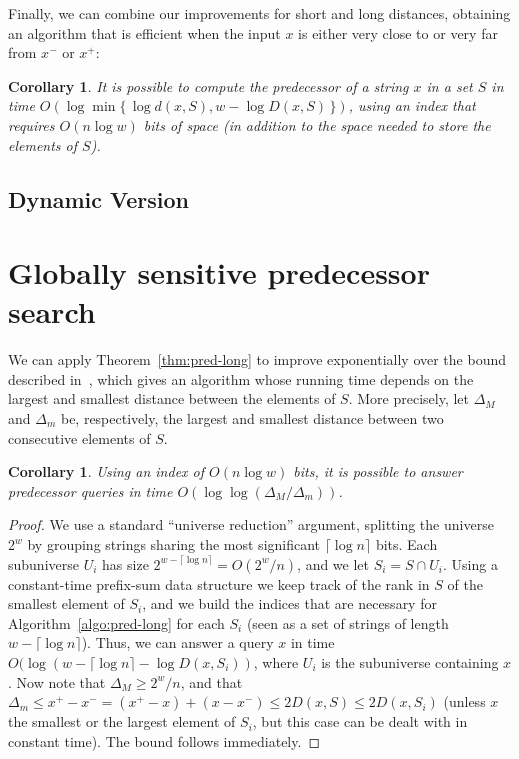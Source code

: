 \documentclass[a4paper,11pt]{article}
\newtheorem{corollary}[theorem]{Corollary}
\newcommand{\?}{\mskip1.5mu}
\begin{document}
Finally, we can combine our improvements for short and long distances, obtaining an algorithm that is
efficient when the input $x$ is either very close to or very far from $x^-$ or $x^+$:
\begin{corollary}
It is possible to compute the predecessor of a string $x$ in a set $S$
in time $O(\log \min \{\,\log d(x,S),w-\log D(x,S)\,\})$, using an index that
requires $O(n \log w)$ bits of space (in addition to the space
needed to store the elements of $S$).
\end{corollary}

\subsection{Dynamic Version}

\section{Globally sensitive predecessor search}

We can apply Theorem~\ref{thm:pred-long} to improve exponentially over the bound
described in~\cite{DemaineJoPa04}, which gives an algorithm whose running time
depends on the largest and smallest distance between the elements of $S$. 
More precisely, let
$\Delta_M$ and $\Delta_m$ be, respectively, the largest and smallest distance
between two consecutive elements of $S$.
\begin{corollary}
\label{cor:deltadelta}
Using an index of $O(n\log w)$ bits, it is possible to answer predecessor
queries in time $O(\log\log(\Delta_M/\Delta_m))$.
\end{corollary}
\begin{proof}
We use a standard ``universe reduction'' argument, splitting 
the universe $2^w$ by grouping strings sharing the most significant $\lceil \log
n\rceil$ bits. Each subuniverse $U_i$ has size $2^{w-\lceil \log
n\rceil}=O(2^w/n)$, and we let $S_i=S\cap U_i$. Using a constant-time
prefix-sum data structure we keep track of the rank in $S$ of the smallest
element of $S_i$, and we build the indices that are necessary for
Algorithm~\ref{algo:pred-long} for each $S_i$ (seen as a set of strings of
length $w-\lceil \log
n\rceil$). Thus, we can answer a query $x$ in time $O(\log(w-\lceil \log
n\rceil -\log D(x,S_i))$, where $U_i$ is the subuniverse containing $x$. Now
note that $\Delta_M\geq 2^w/n$, and that $\Delta_m\leq x^+-x^-
=(x^+-x)+(x-x^-)\leq 2D(x,S)\leq 2D(x,S_i)$ (unless $x$ the smallest or the
largest element of $S_i$, but this case can be dealt with in constant time). The
bound follows immediately.
\end{proof}
\end{document}
